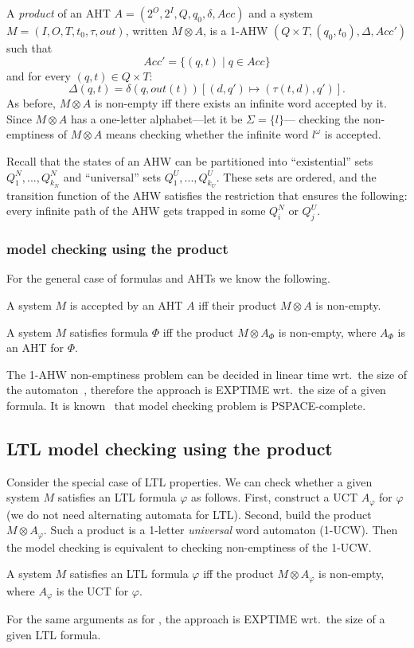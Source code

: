 A \emph{product} of an AHT
$A\!\!=\!\!(2^O, 2^I, Q, q_0, \delta, Acc)$ and a system $M\!\!=\!\!(I,O,T,t_0,\tau,out)$,
written $M \otimes A$,
is a 1-AHW
${(Q \times T, (q_0,t_0), \Delta, Acc')}$
such that
$${Acc'=\{(q,t) \mid q \in Acc\}}$$
and for every $(q,t) \in Q \times T$:
$$
{\Delta(q,t)=\delta(q,out(t))[(d,q') \mapsto (\tau(t,d),q')]}.
$$
As before, $M \otimes A$ is non-empty iff there exists an infinite word accepted by it.
Since $M \otimes A$ has a one-letter alphabet---let it be $\Sigma = \{l\}$---%
checking the non-emptiness of $M \otimes A$ means checking
whether the infinite word $l^\omega$ is accepted.

Recall that the states of an AHW can be partitioned into
``existential'' sets $Q^N_1, ..., Q^N_{k_N}$ and
``universal'' sets $Q^U_1, ..., Q^U_{k_U}$.
These sets are ordered, and the transition function of the AHW
satisfies the restriction that ensures the following:
every infinite path of the AHW gets trapped in some $Q^N_i$ or $Q^U_j$.

\subsubsection{\CTLstar model checking using the product}

For the general case of \CTLstar formulas and AHTs we know the following.
\begin{proposition}
A system $M$ is accepted by an AHT $A$ iff their product $M \otimes A$ is non-empty.
\end{proposition}
\begin{corollary}
A system $M$ satisfies \CTLstar formula $\Phi$ iff the product $M \otimes A_\Phi$
is non-empty,
where $A_\Phi$ is an AHT for $\Phi$.
\end{corollary}
The 1-AHW non-emptiness problem can be decided in linear time wrt.\ the size of the automaton~\cite{ATA},
therefore the approach is EXPTIME wrt.\ the size of a given \CTLstar formula.
It is known~\cite{PrinciplesMC} that \CTLstar model checking problem is PSPACE-complete.


\subsection*{LTL model checking using the product}

Consider the special case of LTL properties.
We can check whether a given system $M$ satisfies an LTL formula $\varphi$
as follows.
First, construct a UCT $A_\varphi$ for $\varphi$
(we do not need alternating automata for LTL).
Second, build the product $M \otimes A_\varphi$.
Such a product is a 1-letter \emph{universal} word automaton (1-UCW).
Then the model checking is equivalent to checking non-emptiness of the 1-UCW.
\begin{proposition}\label{defs:prop:ltl_mc_via_product}\label{page:defs:prop:ltl_mc_via_product}
A system $M$ satisfies an LTL formula $\varphi$
iff
the product $M \otimes A_\varphi$ is non-empty,
where $A_\varphi$ is the UCT for $\varphi$.
\end{proposition}
For the same arguments as for \CTLstar,
the approach is EXPTIME wrt.\ the size of a given LTL formula.


